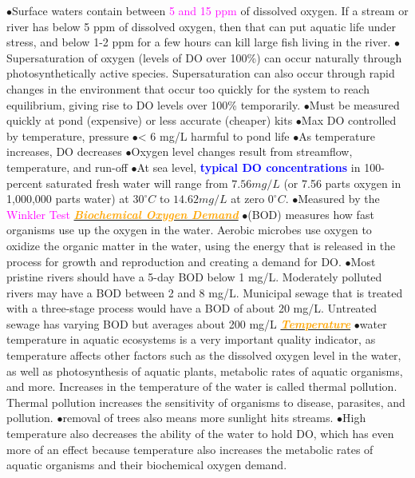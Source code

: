 \documentclass{article}
\newcommand{\ddd}{$\bullet$}
\newcommand{\blue}[1]{\textcolor{blue}{#1}}
\newcommand{\pink}[1]{\textcolor{magenta}{#1}}
\newcommand{\orange}[1]{\textcolor{orange}{#1}}
\newcommand{\mysubsection}[1]{\underline{\textbf{{\textit{\orange{#1}}}}}}
\newcommand{\vocab}[1]{{\pink{#1}}}
\begin{document}
\begin{multicols*}{4}
            \ddd Surface waters contain between \pink{5 and 15 ppm} of dissolved oxygen. If a stream or river has below 5 ppm of dissolved oxygen, then that can put aquatic life under stress, and below 1-2 ppm for a few hours can kill large fish living in the river.
            \ddd Supersaturation of oxygen (levels of DO over 100\%) can occur naturally through photosynthetically active species. Supersaturation can also occur through rapid changes in the environment that occur too quickly for the system to reach equilibrium, giving rise to DO levels over 100\% temporarily.
                        \ddd Must be measured quickly at pond (expensive) or less accurate (cheaper) kits
            \ddd Max DO controlled by temperature, pressure
            \ddd < 6 mg/L harmful to pond life
            \ddd As temperature increases, DO decreases
            \ddd Oxygen level changes result from streamflow, temperature, and run-off
            \ddd At sea level, \textbf{\blue{typical DO concentrations}} in 100-percent saturated fresh water will range from $7.56 mg/L$ (or 7.56 parts oxygen in 1,000,000 parts water) at $30^\circ C$ to $14.62 mg/L$ at zero $0^\circ C$.
            \ddd Measured by the \vocab{Winkler Test}
        \mysubsection{Biochemical Oxygen Demand}
            \ddd (BOD) measures how fast organisms use up the oxygen in the water. Aerobic microbes use oxygen to oxidize the organic matter in the water, using the energy that is released in the process for growth and reproduction and creating a demand for DO.
            \ddd Most pristine rivers should have a 5-day BOD below 1 mg/L. Moderately polluted rivers may have a BOD between 2 and 8 mg/L. Municipal sewage that is treated with a three-stage process would have a BOD of about 20 mg/L. Untreated sewage has varying BOD but averages about 200 mg/L    
        \mysubsection{Temperature}
            \ddd water temperature in aquatic ecosystems is a very important quality indicator, as temperature affects other factors such as the dissolved oxygen level in the water, as well as photosynthesis of aquatic plants, metabolic rates of aquatic organisms, and more. Increases in the temperature of the water is called thermal pollution. Thermal pollution increases the sensitivity of organisms to disease, parasites, and pollution.
            \ddd removal of trees also means more sunlight hits streams. 
            \ddd  High temperature also decreases the ability of the water to hold DO, which has even more of an effect because temperature also increases the metabolic rates of aquatic organisms and their biochemical oxygen demand. 

\end{multicols*}
\end{document}
